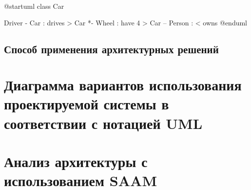 \documentclass[PI,LAB]{HSEUniversity}
\begin{document}
	\begin{plantuml}
		@startuml
		class Car
		
		Driver - Car : drives >
		Car *- Wheel : have 4 >
		Car -- Person : < owns
		@enduml
	\end{plantuml}

\section {Способ применения архитектурных решений}
\chapter{Диаграмма вариантов использования проектируемой системы в соответствии с нотацией UML}
\chapter{Анализ архитектуры с использованием SAAM}

    
\end{document}
